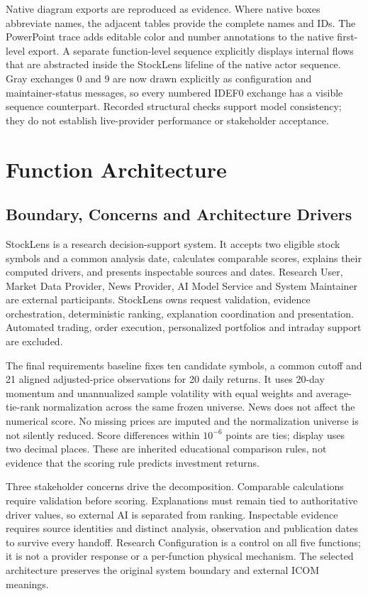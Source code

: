 \documentclass[11pt,letterpaper]{article}
\begin{document}
Native diagram exports are reproduced as evidence. Where native boxes abbreviate names, the adjacent tables provide the complete names and IDs. The PowerPoint trace adds editable color and number annotations to the native first-level export. A separate function-level sequence explicitly displays internal flows that are abstracted inside the StockLens lifeline of the native actor sequence. Gray exchanges 0 and 9 are now drawn explicitly as configuration and maintainer-status messages, so every numbered IDEF0 exchange has a visible sequence counterpart. Recorded structural checks support model consistency; they do not establish live-provider performance or stakeholder acceptance.

\section{Function Architecture}
\subsection{Boundary, Concerns and Architecture Drivers}
StockLens is a research decision-support system. It accepts two eligible stock symbols and a common analysis date, calculates comparable scores, explains their computed drivers, and presents inspectable sources and dates. Research User, Market Data Provider, News Provider, AI Model Service and System Maintainer are external participants. StockLens owns request validation, evidence orchestration, deterministic ranking, explanation coordination and presentation. Automated trading, order execution, personalized portfolios and intraday support are excluded.

The final requirements baseline fixes ten candidate symbols, a common cutoff and 21 aligned adjusted-price observations for 20 daily returns. It uses 20-day momentum and unannualized sample volatility with equal weights and average-tie-rank normalization across the same frozen universe. News does not affect the numerical score. No missing prices are imputed and the normalization universe is not silently reduced. Score differences within $10^{-6}$ points are ties; display uses two decimal places\cite{baseline}. These are inherited educational comparison rules, not evidence that the scoring rule predicts investment returns.

Three stakeholder concerns drive the decomposition. Comparable calculations require validation before scoring. Explanations must remain tied to authoritative driver values, so external AI is separated from ranking. Inspectable evidence requires source identities and distinct analysis, observation and publication dates to survive every handoff. Research Configuration is a control on all five functions; it is not a provider response or a per-function physical mechanism. The selected architecture preserves the original system boundary and external ICOM meanings.
\end{document}
